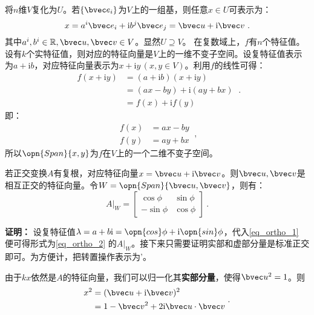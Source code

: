 将$n$维$V$复化为$U$。若$\{\bvec e_i\}$为$V$上的一组基，则任意$x\in U$可表示为：
\begin{equation}
x=a^i\bvec e_i+\mathrm i b^j\bvec e_j=\bvec u+\mathrm i\bvec v~.
\end{equation}
其中$a^i,b^i\in \mathbb R,\bvec u,\bvec v\in V$。显然$U\supseteq V$。
在复数域上，$f$有$n$个特征值。设有$k$个实特征值，则对应的特征向量是$V$上的一维不变子空间。设复特征值表示为$a+\mathrm ib$，对应特征向量表示为$x+\mathrm i y\,(x,y\in V)$。利用$f$的线性可得：
\begin{equation}
\begin{aligned}
f(x+\mathrm i y)&=(a+\mathrm i b)(x+\mathrm i y)\\
&=(ax-by)+\mathrm i(ay+bx)\\
&=f(x)+\mathrm if(y)
\end{aligned}~.
\end{equation}
即：
\begin{equation}\label{eq_ortho_1}
\begin{aligned}
f(x)&=ax-by\\
f(y)&=ay+bx
\end{aligned}~,
\end{equation}
所以$\opn{Span}\{x,y\}$为$f$在$V$上的一个二维不变子空间。
\begin{lemma}{}\label{lem_ortho_3}
若正交变换$A$有复根，对应特征向量$x=\bvec u+\mathrm i\bvec v$。则$\bvec u,\bvec v$是相互正交的特征向量。令$W=\opn{Span}\{\bvec u,\bvec v\}$，则有：
\begin{equation}\label{eq_ortho_2}
A|_W=\left[\begin{array}{rr}
\cos \phi & \sin \phi \\
-\sin \phi & \cos \phi
\end{array}\right]~.
\end{equation}
\end{lemma}
\textbf{证明：}
设复特征值$\lambda=a+b\mathrm i=\opn{cos}\phi+\mathrm i \opn{sin}\phi$，代入\autoref{eq_ortho_1} 便可得形式为\autoref{eq_ortho_2} 的$A|_W$。接下来只需要证明实部和虚部分量是标准正交即可。为方便计，把转置操作表示为'。

由于$kx$依然是$A$的特征向量，我们可以归一化其\textbf{实部分量}，使得$\bvec u^2=1$。则
\begin{equation}\label{eq_ortho_3}
\begin{aligned}
x^2&=(\bvec u+\mathrm i\bvec v)^2\\
&=1-\bvec v^2+2\mathrm i \bvec u\cdot\bvec v
\end{aligned}~.
\end{equation}

